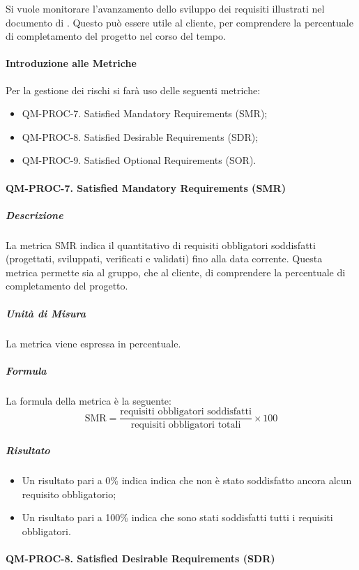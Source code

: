 		Si vuole monitorare l'avanzamento dello sviluppo dei requisiti illustrati nel documento di . Questo può essere utile al cliente, per comprendere la percentuale di completamento del progetto nel corso del tempo.

		\paragraph{Introduzione alle Metriche}

		Per la gestione dei rischi si farà uso delle seguenti metriche:

		\begin{itemize}
			\item QM-PROC-7. Satisfied Mandatory Requirements (SMR);
			\item QM-PROC-8. Satisfied Desirable Requirements (SDR);
			\item QM-PROC-9. Satisfied Optional Requirements (SOR).
		\end{itemize}

		\paragraph{QM-PROC-7. Satisfied Mandatory Requirements (SMR)}

			\subparagraph{Descrizione}
			La metrica SMR indica il quantitativo di requisiti obbligatori soddisfatti (progettati, sviluppati, verificati e validati) fino alla data corrente. Questa metrica permette sia al gruppo, che al cliente, di comprendere la percentuale di completamento del progetto.

			\subparagraph{Unità di Misura}
			La metrica viene espressa in percentuale.

			\subparagraph{Formula}
			La formula della metrica è la seguente:
			\[
				\text{SMR} = \frac{\text{requisiti obbligatori soddisfatti}}{\text{requisiti obbligatori totali}} \times 100
			\]

			\subparagraph{Risultato}
			\begin{itemize}
				\item Un risultato pari a 0\% indica indica che non è stato soddisfatto ancora alcun requisito obbligatorio;
				\item Un risultato pari a 100\% indica che sono stati soddisfatti tutti i requisiti obbligatori.
			\end{itemize}

		\paragraph{QM-PROC-8. Satisfied Desirable Requirements (SDR)}

